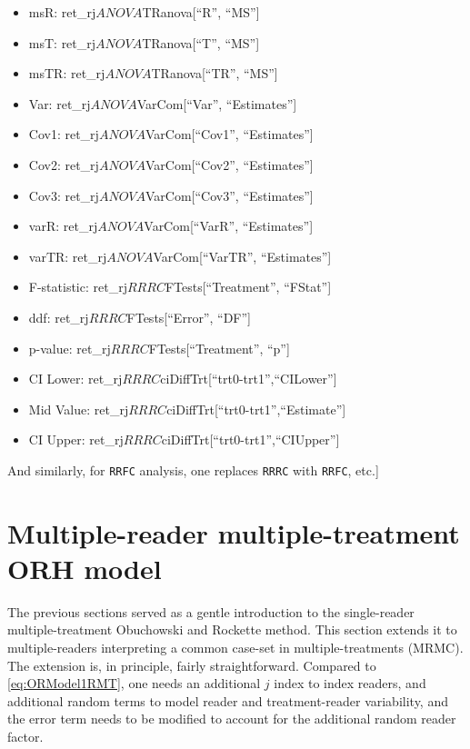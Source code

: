 \documentclass[
]{book}
\providecommand{\tightlist}{%
  \setlength{\itemsep}{0pt}\setlength{\parskip}{0pt}}
\begin{document}
\begin{itemize}
\tightlist
\item
  msR: ret\_rj\(ANOVA\)TRanova{[}``R'', ``MS''{]}
\item
  msT: ret\_rj\(ANOVA\)TRanova{[}``T'', ``MS''{]}
\item
  msTR: ret\_rj\(ANOVA\)TRanova{[}``TR'', ``MS''{]}
\item
  Var: ret\_rj\(ANOVA\)VarCom{[}``Var'', ``Estimates''{]}
\item
  Cov1: ret\_rj\(ANOVA\)VarCom{[}``Cov1'', ``Estimates''{]}
\item
  Cov2: ret\_rj\(ANOVA\)VarCom{[}``Cov2'', ``Estimates''{]}
\item
  Cov3: ret\_rj\(ANOVA\)VarCom{[}``Cov3'', ``Estimates''{]}
\item
  varR: ret\_rj\(ANOVA\)VarCom{[}``VarR'', ``Estimates''{]}
\item
  varTR: ret\_rj\(ANOVA\)VarCom{[}``VarTR'', ``Estimates''{]}
\item
  F-statistic: ret\_rj\(RRRC\)FTests{[}``Treatment'', ``FStat''{]}
\item
  ddf: ret\_rj\(RRRC\)FTests{[}``Error'', ``DF''{]}
\item
  p-value: ret\_rj\(RRRC\)FTests{[}``Treatment'', ``p''{]}
\item
  CI Lower: ret\_rj\(RRRC\)ciDiffTrt{[}``trt0-trt1'',``CILower''{]}
\item
  Mid Value: ret\_rj\(RRRC\)ciDiffTrt{[}``trt0-trt1'',``Estimate''{]}
\item
  CI Upper: ret\_rj\(RRRC\)ciDiffTrt{[}``trt0-trt1'',``CIUpper''{]}
\end{itemize}

And similarly, for \texttt{RRFC} analysis, one replaces \texttt{RRRC} with \texttt{RRFC}, etc.{]}

\hypertarget{multiple-reader-multiple-treatment-orh-model}{%
\section{Multiple-reader multiple-treatment ORH model}\label{multiple-reader-multiple-treatment-orh-model}}

The previous sections served as a gentle introduction to the single-reader multiple-treatment Obuchowski and Rockette method. This section extends it to multiple-readers interpreting a common case-set in multiple-treatments (MRMC). The extension is, in principle, fairly straightforward. Compared to \eqref{eq:ORModel1RMT}, one needs an additional \(j\) index to index readers, and additional random terms to model reader and treatment-reader variability, and the error term needs to be modified to account for the additional random reader factor.
\end{document}
